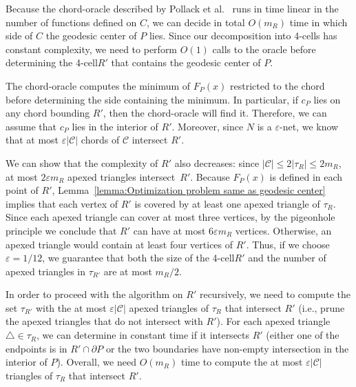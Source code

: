 \documentclass[a4paper,UKenglish]{lipics}
\newcommand{\F}[2]{\ensuremath{F_{\scriptscriptstyle #1}(#2)}}
\newcommand{\cp}{\ensuremath{c_P}}
\newcommand{\m}{\ensuremath{m_{\scriptscriptstyle R}}}
\newcommand{\reg}{\ensuremath{R'}}
\newcommand{\tcell}{4-cell\xspace}
\newcommand{\tcells}{4-cells\xspace}
\begin{document}
Because the chord-oracle described by Pollack et al.~\cite[Section~3]{pollackComputingCenter} runs in time linear in the number of functions defined on $C$, we can decide in total $O(\m)$ time in which side of $C$ the geodesic center of $P$ lies. 
Since our decomposition into \tcells has constant complexity, 
we need to perform $O(1)$ calls to the oracle before determining the \tcell $\reg$ that contains the geodesic center of $P$. 

The chord-oracle computes the minimum of $\F{P}{x}$ restricted to the chord before determining the side containing the minimum. In particular, if $\cp$ lies on any chord bounding $\reg$, then the chord-oracle will find it. 
Therefore, we can assume that $\cp$ lies in the interior of $\reg$. Moreover, since $N$ is a $\varepsilon$-net, we know that at most $\varepsilon |\mathcal C|$ chords of $\mathcal C$ intersect $\reg$.

We can show that the complexity of $\reg$ also decreases: since $|\mathcal C| \leq 2|\tau_R| \leq 2\m$, at most $2\varepsilon \m$ apexed triangles intersect~$\reg$. Because $\F{P}{x}$ is defined in each point of $R'$, Lemma~\ref{lemma:Optimization problem same as geodesic center} implies that each vertex of $\reg$ is covered by at least one apexed triangle of $\tau_R$. 
Since each apexed triangle can cover at most three vertices, 
by the pigeonhole principle we conclude that $\reg$ can have at most $6 \varepsilon \m$ vertices. Otherwise, an apexed triangle would contain at least four vertices of $\reg$.
Thus, if we choose $\varepsilon = 1/12$, we guarantee that both the size of the \tcell $\reg$ and the number of apexed triangles in $\tau_{\reg}$ are at most $\m/2$. 


In order to proceed with the algorithm on  $\reg$ recursively, we need to compute the set $\tau_{\reg}$ with the at most $\varepsilon |\mathcal C|$ apexed triangles of $\tau_R$ that intersect $\reg$ (i.e., prune the apexed triangles that do not intersect with $\reg$). For each apexed triangle $\triangle\in \tau_R$, we can determine in constant time if it intersects $\reg$ (either one of the endpoints is in $\reg\cap \partial P$ or the two boundaries have non-empty intersection in the interior of $P$). 
Overall, we need $O(\m)$ time to compute the at most $\varepsilon |\mathcal C|$ triangles of $\tau_R$ that intersect $\reg$.
\end{document}
